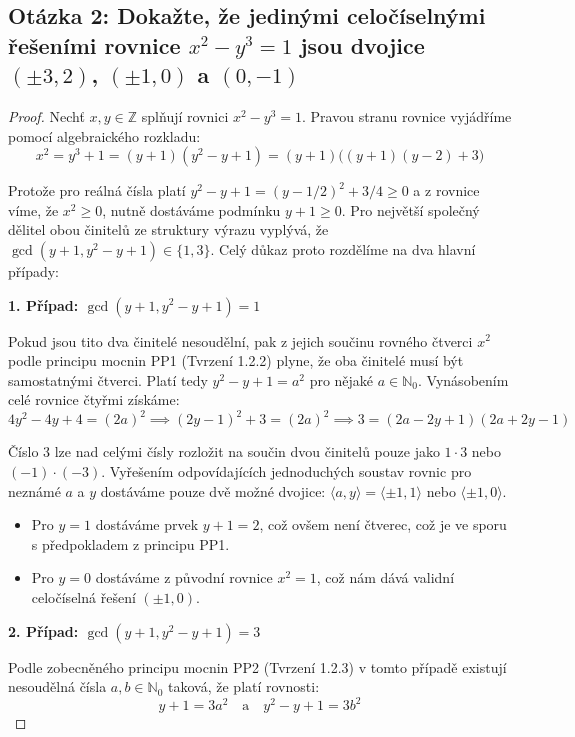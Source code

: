 \documentclass[a4paper,12pt]{article}
\begin{document}
\subsection*{Otázka 2: Dokažte, že jedinými celočíselnými řešeními rovnice $x^2 - y^3 = 1$ jsou dvojice $(\pm3,2)$, $(\pm1,0)$ a $(0,-1)$}

\begin{proof}
Nechť $x, y \in \mathbb{Z}$ splňují rovnici $x^2 - y^3 = 1$. Pravou stranu rovnice vyjádříme pomocí algebraického rozkladu:
$$x^2 = y^3 + 1 = (y + 1)(y^2 - y + 1) = (y + 1)\big((y + 1)(y - 2) + 3\big)$$ 

Protože pro reálná čísla platí $y^2 - y + 1 = (y - 1/2)^2 + 3/4 \ge 0$ a z rovnice víme, že $x^2 \ge 0$, nutně dostáváme podmínku $y + 1 \ge 0$. Pro největší společný dělitel obou činitelů ze struktury výrazu vyplývá, že $\gcd(y + 1, y^2 - y + 1) \in \{1, 3\}$. Celý důkaz proto rozdělíme na dva hlavní případy:

\textbf{1. Případ: $\gcd(y + 1, y^2 - y + 1) = 1$}
\vspace{0.5em}

Pokud jsou tito dva činitelé nesoudělní, pak z jejich součinu rovného čtverci $x^2$ podle principu mocnin PP1 (Tvrzení 1.2.2) plyne, že oba činitelé musí být samostatnými čtverci. Platí tedy $y^2 - y + 1 = a^2$ pro nějaké $a \in \mathbb{N}_0$. Vynásobením celé rovnice čtyřmi získáme:
$$4y^2 - 4y + 4 = (2a)^2 \implies (2y - 1)^2 + 3 = (2a)^2 \implies 3 = (2a - 2y + 1)(2a + 2y - 1)$$ 

Číslo 3 lze nad celými čísly rozložit na součin dvou činitelů pouze jako $1 \cdot 3$ nebo $(-1) \cdot (-3)$. Vyřešením odpovídajících jednoduchých soustav rovnic pro neznámé $a$ a $y$ dostáváme pouze dvě možné dvojice: $\langle a, y \rangle = \langle \pm1, 1 \rangle$ nebo $\langle \pm1, 0 \rangle$.
\begin{itemize}
    \item Pro $y = 1$ dostáváme prvek $y + 1 = 2$, což ovšem není čtverec, což je ve sporu s předpokladem z principu PP1.
    \item Pro $y = 0$ dostáváme z původní rovnice $x^2 = 1$, což nám dává validní celočíselná řešení $(\pm1, 0)$.
\end{itemize}

\vspace{1em}
\textbf{2. Případ: $\gcd(y + 1, y^2 - y + 1) = 3$}
\vspace{0.5em}

Podle zobecněného principu mocnin PP2 (Tvrzení 1.2.3) v tomto případě existují nesoudělná čísla $a, b \in \mathbb{N}_0$ taková, že platí rovnosti:
$$y + 1 = 3a^2 \quad \text{a} \quad y^2 - y + 1 = 3b^2$$ 


\end{proof}
\end{document}
